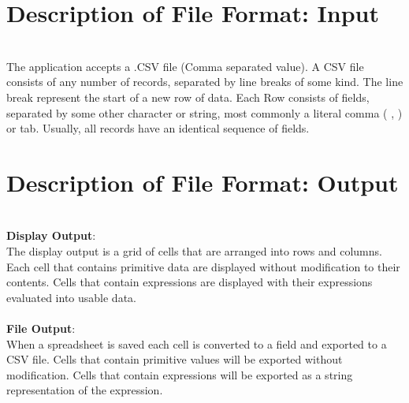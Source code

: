 \documentclass[12pt]{article}
\begin{document}
\appendix

\section{Description of File Format: Input}
\noindent\\
The application accepts a .CSV file (Comma separated value).  A CSV file consists of any number of records, separated by line breaks of some kind. The line break represent the start of a new row of data. Each Row consists of fields, separated by some other character or string, most commonly a literal comma ( , ) or tab. Usually, all records have an identical sequence of fields.

\section{Description of File Format: Output}
\noindent\\
{\bf Display Output}: \\The display output is a grid of cells that are arranged into rows and columns. Each cell that contains primitive data are displayed without modification to their contents. Cells that contain expressions are displayed with their expressions evaluated into usable data.
\noindent\\\\
{\bf File Output}:\\When a spreadsheet is saved each cell is converted to a field and exported to a CSV file. Cells that contain primitive values will be exported without modification. Cells that contain expressions will be exported as a string representation of the expression.\\
\end{document}
